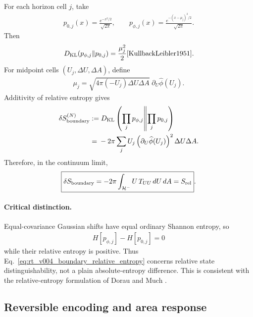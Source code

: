 For each horizon cell $j$, take
\begin{align}
    p_{0,j}(x)
    =
    \frac{e^{-x^2/2}}{\sqrt{2\pi}},
    \qquad
    p_{\phi,j}(x)
    =
    \frac{e^{-(x-\mu_j)^2/2}}{\sqrt{2\pi}}.
\end{align}
Then
\begin{align}
    D_{\rm KL}(p_{\phi,j}\Vert p_{0,j})
    =
    \frac{\mu_j^2}{2}
    \cite{KullbackLeibler1951}.
\end{align}
For midpoint cells $(U_j,\Delta U,\Delta A)$, define
\begin{align}
    \boxed{
    \mu_j
    =
    \sqrt{4\pi(-U_j)\Delta U\Delta A}
    \;\partial_U\widehat\phi(U_j)
    }.
    \label{eq:rt_v004_gaussian_shift}
\end{align}
Additivity of relative entropy gives
\begin{align}
    \delta S_{\rm boundary}^{(N)}
    &:={}
    D_{\rm KL}
    \left(
    \prod_jp_{\phi,j}
    \middle\Vert
    \prod_jp_{0,j}
    \right)
    \\
    &={}
    -2\pi
    \sum_j
    U_j
    \left(\partial_U\widehat\phi(U_j)\right)^2
    \Delta U\Delta A.
\end{align}
Therefore, in the continuum limit,
\begin{align}
    \boxed{
    \delta S_{\rm boundary}
    =
    -2\pi
    \int_{\mathcal H^-}
    U\,T_{UU}\,dU\,dA
    =
    S_{\rm rel}
    }.
    \label{eq:rt_v004_boundary_relative_entropy}
\end{align}

\paragraph{Critical distinction.}
Equal-covariance Gaussian shifts have equal ordinary Shannon entropy, so
\begin{align}
    H[p_{\phi,j}]-H[p_{0,j}]=0
\end{align}
while their relative entropy is positive. Thus
Eq.~\eqref{eq:rt_v004_boundary_relative_entropy} concerns relative
state distinguishability, not a plain absolute-entropy difference. This is
consistent with the relative-entropy formulation of Dorau and Much
\cite{DorauMuch2026}.

\subsection{Reversible encoding and area response}

